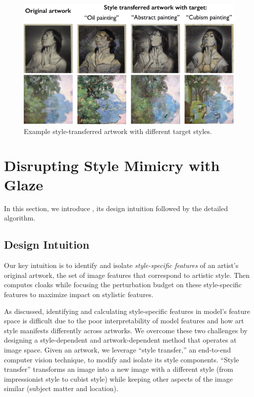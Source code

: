 \begin{figure}[t]
  \centering
  \includegraphics[width=1\columnwidth]{plots/eval/style-transfer-example.pdf}
  \caption{Example style-transferred artwork with different target styles. }
  \label{fig:transfer-examples}
\end{figure}

\secspace
\section{Disrupting Style Mimicry with Glaze} 
\label{sec:design}

In this section, we introduce \system{}, its design intuition followed by the
detailed algorithm. 

\secspace
\subsection{Design Intuition}
\label{sec:intuition-cloak}

Our key intuition is to identify and isolate \textit{style-specific features}
of an artist's original artwork, \ie the set of image features that
correspond to artistic style. Then \system{} computes cloaks while focusing
the perturbation budget on these style-specific features to maximize impact
on stylistic features.

As discussed, identifying and calculating style-specific features in model's
feature space is difficult due to the poor interpretability of model features
and how art style manifests differently across artworks. We overcome these two
challenges by designing a style-dependent and artwork-dependent method that
operates at image space. Given an artwork, we leverage ``style transfer,'' an
end-to-end computer vision technique, to modify and isolate its style
components. ``Style transfer'' transforms an image into a new image with a
different style (\eg from impressionist style to cubist style) while keeping
other aspects of the image similar (\eg subject matter and location).

